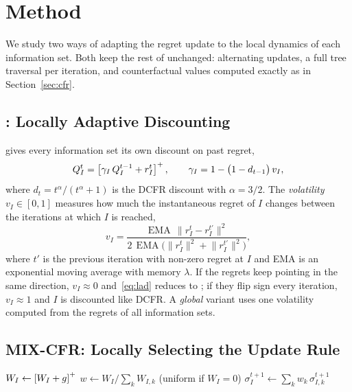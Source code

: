 \section{Method}
\label{sec:method}

We study two ways of adapting the regret update to the local dynamics of each information set.
Both keep the rest of \cfrp{} unchanged: alternating updates, a full tree traversal per
iteration, and counterfactual values computed exactly as in Section~\ref{sec:cfr}.

\subsection{\ours{}: Locally Adaptive Discounting}
\label{sec:lad}

\ours{} gives every information set its own discount on past regret,
\begin{equation}
  Q^t_I = \left[\gamma_I\, Q^{t-1}_I + r^t_I\right]^{+}, \qquad
  \gamma_I = 1 - \big(1 - d_{t-1}\big)\, v_I,
  \label{eq:lad}
\end{equation}
where $d_t = t^{\alpha}/(t^{\alpha}+1)$ is the DCFR discount with $\alpha = 3/2$. The
\emph{volatility} $v_I \in [0,1]$ measures how much the instantaneous regret of $I$ changes
between the iterations at which $I$ is reached,
\begin{equation}
  v_I = \frac{\operatorname{EMA}\,\lVert r^t_I - r^{t'}_I\rVert^2}
             {2\,\operatorname{EMA}\big(\lVert r^t_I\rVert^2 + \lVert r^{t'}_I\rVert^2\big)},
  \label{eq:vol}
\end{equation}
where $t'$ is the previous iteration with non-zero regret at $I$ and EMA is an exponential
moving average with memory $\lambda$. If the regrets keep pointing in the same direction,
$v_I \approx 0$ and~\eqref{eq:lad} reduces to \cfrp{}; if they flip sign every iteration,
$v_I \approx 1$ and $I$ is discounted like DCFR. A \emph{global} variant uses one volatility
computed from the regrets of all information sets.

\subsection{MIX-CFR: Locally Selecting the Update Rule}
\label{sec:mix}

\begin{algorithm}[t]
\caption{MIX-CFR update at information set $I$}
\label{alg:mix}
$W_I \leftarrow \left[W_I + g\right]^{+}$ 
$w \leftarrow W_I / \sum_k W_{I,k}$ (uniform if $W_I = 0$)\;
$\sigma^{t+1}_I \leftarrow \sum_k w_k\, \sigma^{t+1}_{I,k}$\;
\end{algorithm}

